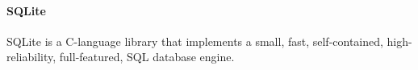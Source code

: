 \paragraph{SQLite}
SQLite is a C-language library that implements a small, fast, self-contained, 
high-reliability, full-featured, SQL database engine.
